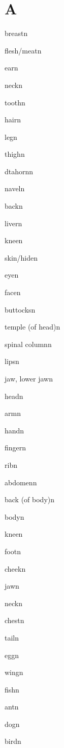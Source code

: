\documentclass[12pt,a4paper,twoside]{article}
\begin{document}
\section*{A}%
\begin{multicols}{2}
{}{breast}{n}{}

{}{flesh/meat}{n}{}

{}{ear}{n}{}

{}{neck}{n}{}

{}{tooth}{n}{}

{}{hair}{n}{}

{}{leg}{n}{}

{}{thigh}{n}{}

{dta}{horn}{n}{}

{}{navel}{n}{}

{}{back}{n}{}

{}{liver}{n}{}

{}{knee}{n}{}

{}{skin/hide}{n}{}

{}{eye}{n}{}

{}{face}{n}{}

{}{buttocks}{n}{}

{}{temple (of head)}{n}{}

{}{spinal column}{n}{}

{}{lips}{n}{}

{}{jaw, lower jaw}{n}{}

{}{head}{n}{}

{}{arm}{n}{}

{}{hand}{n}{}

{}{finger}{n}{}

{}{rib}{n}{}

{}{abdomen}{n}{}

{}{back (of body)}{n}{}

{}{body}{n}{}

{}{knee}{n}{}

{}{foot}{n}{}

{}{cheek}{n}{}

{}{jaw}{n}{}

{}{neck}{n}{}

{}{chest}{n}{}

{}{tail}{n}{}

{}{egg}{n}{}

{}{wing}{n}{}

{}{fish}{n}{}

{}{ant}{n}{}

{}{dog}{n}{}

{}{bird}{n}{}


\end{multicols}
\end{document}
